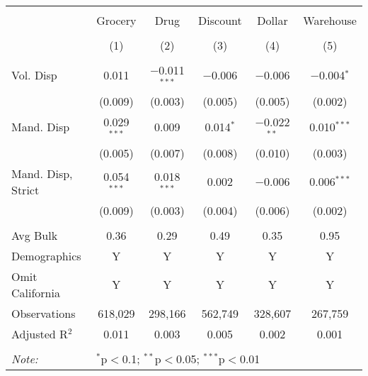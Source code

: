 
\begin{table}[!htbp] \centering 
  \caption{} 
  \label{} 
\begin{tabular}{@{\extracolsep{5pt}}lccccc} 
\\[-1.8ex]\hline 
\hline \\[-1.8ex] 
 & Grocery & Drug & Discount & Dollar & Warehouse \\ 
\\[-1.8ex] & (1) & (2) & (3) & (4) & (5)\\ 
\hline \\[-1.8ex] 
 Vol. Disp & 0.011 & $-$0.011$^{***}$ & $-$0.006 & $-$0.006 & $-$0.004$^{*}$ \\ 
  & (0.009) & (0.003) & (0.005) & (0.005) & (0.002) \\ 
  Mand. Disp & 0.029$^{***}$ & 0.009 & 0.014$^{*}$ & $-$0.022$^{**}$ & 0.010$^{***}$ \\ 
  & (0.005) & (0.007) & (0.008) & (0.010) & (0.003) \\ 
  Mand. Disp, Strict & 0.054$^{***}$ & 0.018$^{***}$ & 0.002 & $-$0.006 & 0.006$^{***}$ \\ 
  & (0.009) & (0.003) & (0.004) & (0.006) & (0.002) \\ 
 \hline \\[-1.8ex] 
Avg Bulk & 0.36 & 0.29 & 0.49 & 0.35 & 0.95 \\ 
Demographics & Y & Y & Y & Y & Y \\ 
Omit California & Y & Y & Y & Y & Y \\ 
Observations & 618,029 & 298,166 & 562,749 & 328,607 & 267,759 \\ 
Adjusted R$^{2}$ & 0.011 & 0.003 & 0.005 & 0.002 & 0.001 \\ 
\hline 
\hline \\[-1.8ex] 
\textit{Note:}  & \multicolumn{5}{l}{$^{*}$p$<$0.1; $^{**}$p$<$0.05; $^{***}$p$<$0.01} \\ 
\end{tabular} 
\end{table} 
